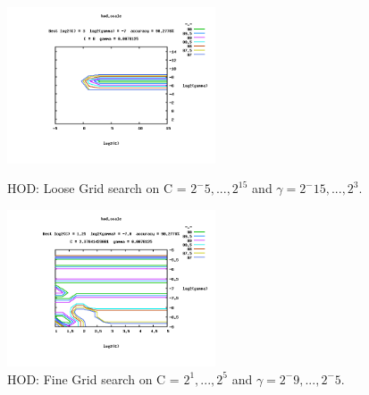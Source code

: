 \documentclass[11pt,nocopyrightspace]{config}
\begin{document}
\begin{figure}[p]
	\centering
	\includegraphics[width=0.55\textwidth]{coarseGridHod}
	\caption{HOD: Loose Grid search on C = $2^-5,...,2^15$ and $\gamma=2^-15,...,2^3$.}
	\label{fig:looseHod}
	\centering
	\includegraphics[width=0.55\textwidth]{fineGridHod}
	\caption{HOD: Fine Grid search on C = $2^1,...,2^5$ and $\gamma=2^-9,...,2^-5$.}
	\label{fig:fineHod}
\end{figure}
\end{document}
